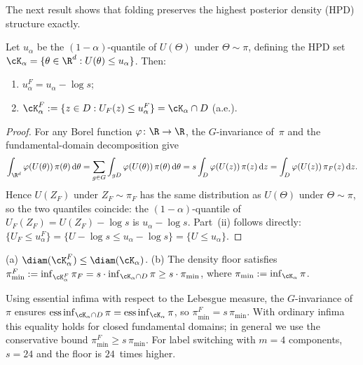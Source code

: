 The next result shows that folding preserves the highest posterior
density (HPD) structure exactly.

\begin{proposition}\label{prop:hpd}
  Let $u_\alpha$ be the $(1{-}\alpha)$-quantile of $U(\Theta)$ under
  $\Theta \sim \pi$, defining the HPD set
  $\cK_\alpha = \{\theta \in \R^d : U(\theta) \leq u_\alpha\}$.
  Then:
  \begin{enumerate}[nosep]
    \item $u_\alpha^F = u_\alpha - \log s$;
    \item $\cK_\alpha^F
      := \{z \in D : U_F(z) \leq u_\alpha^F\}
      = \cK_\alpha \cap D$ \;(a.e.).
  \end{enumerate}
\end{proposition}

\begin{proof}
  For any Borel function $\varphi\colon \R \to \R$, the $G$-invariance
  of~$\pi$ and the fundamental-domain decomposition give
  \[
    \int_{\R^d} \varphi(U(\theta))\,\pi(\theta)\,\mathrm{d}\theta
    = \sum_{g \in G} \int_{gD} \varphi(U(\theta))\,\pi(\theta)\,\mathrm{d}\theta
    = s \int_D \varphi(U(z))\,\pi(z)\,\mathrm{d}z
    = \int_D \varphi(U(z))\,\pi_F(z)\,\mathrm{d}z.
  \]
  Hence $U(Z_F)$ under $Z_F \sim \pi_F$ has the same distribution as
  $U(\Theta)$ under $\Theta \sim \pi$, so the two quantiles coincide:
  the $(1{-}\alpha)$-quantile of $U_F(Z_F) = U(Z_F) - \log s$
  is $u_\alpha - \log s$.
  Part~(ii) follows directly:
  $\{U_F \leq u_\alpha^F\} = \{U - \log s \leq u_\alpha - \log s\}
  = \{U \leq u_\alpha\}$.
\end{proof}

\begin{corollary}\label{cor:hpd_geometry}
  (a) $\diam(\cK_\alpha^F) \leq \diam(\cK_\alpha)$.
  (b) The density floor satisfies
  $\pi_{\min}^F := \inf_{\cK_\alpha^F} \pi_F
  = s \cdot \inf_{\cK_\alpha \cap D} \pi \geq s \cdot \pi_{\min}$,
  where $\pi_{\min} := \inf_{\cK_\alpha} \pi$.
\end{corollary}

\noindent
Using essential infima with respect to the Lebesgue measure,
the $G$-invariance of~$\pi$ ensures
$\operatorname{ess\,inf}_{\cK_\alpha \cap D} \pi
= \operatorname{ess\,inf}_{\cK_\alpha} \pi$,
so $\pi_{\min}^F = s\,\pi_{\min}$.  With ordinary infima this
equality holds for closed fundamental domains; in general we use
the conservative bound $\pi_{\min}^F \geq s\,\pi_{\min}$.
For label switching with $m = 4$ components, $s = 24$ and the
floor is $24$~times higher.


